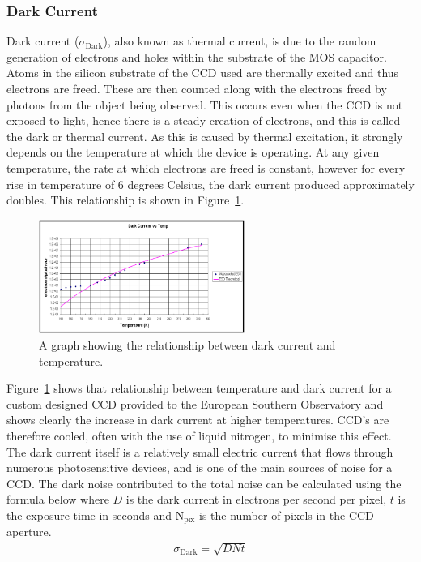 		\subsubsection{Dark Current} %
		\label{ssub:dark_current}
			Dark current ($\sigma_\text{Dark}$), also known as thermal current, is due to the random generation of electrons and holes within the substrate of the MOS capacitor. Atoms in the silicon substrate of the CCD used are thermally excited and thus electrons are freed. These are then counted along with the electrons freed by photons from the object being observed. This occurs even when the CCD is not exposed to light, hence there is a steady creation of electrons, and this is called the dark or thermal current. As this is caused by thermal excitation, it strongly depends on the temperature at which the device is operating. At any given temperature, the rate at which electrons are freed is constant, however for every rise in temperature of 6 degrees Celsius, the dark current produced approximately doubles\cite{Astronomical_Image_Processing}. This relationship is shown in Figure~\ref{fig:dark_current_vs_temp}\cite{Southern_Observatory_throughput}.
			\begin{figure}[!htbp]
				\centering
				\includegraphics[width=0.6\textwidth]{../Images/Dark.png}
				\caption{A graph showing the relationship between dark current and temperature.\label{fig:dark_current_vs_temp}}
			\end{figure}

			Figure~\ref{fig:dark_current_vs_temp} shows that relationship between temperature and dark current for a custom designed CCD provided to the European Southern Observatory and shows clearly the increase in dark current at higher temperatures. CCD's are therefore cooled, often with the use of liquid nitrogen, to minimise this effect. The dark current itself is a relatively small electric current that flows through numerous photosensitive devices, and is one of the main sources of noise for a CCD. The dark noise contributed to the total noise can be calculated using the formula below where $D$ is the dark current in electrons per second per pixel, $t$ is the exposure time in seconds and N$_\text{pix}$ is the number of pixels in the CCD aperture.
			\begin{align}
				\sigma_\text{Dark} = \sqrt{DNt}
			\end{align}


